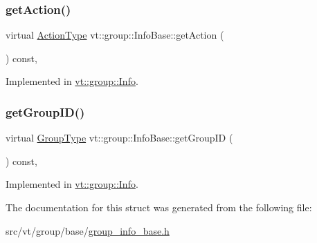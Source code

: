 \subsubsection{\texorpdfstring{get\+Action()}{getAction()}}
{\footnotesize\ttfamily virtual \hyperlink{namespacevt_ae0a5a7b18cc99d7b732cb4d44f46b0f3}{Action\+Type} vt\+::group\+::\+Info\+Base\+::get\+Action (\begin{DoxyParamCaption}{ }\end{DoxyParamCaption}) const\hspace{0.3cm}{\ttfamily [protected]}, {}}



Implemented in \hyperlink{structvt_1_1group_1_1_info_a399b8266c01f53484469b3b14cdc8640}{vt\+::group\+::\+Info}.

\mbox{\label{structvt_1_1group_1_1_info_base_afbb8a9919c924c50be2b99e2dc7cbca2}} 
\subsubsection{\texorpdfstring{get\+Group\+I\+D()}{getGroupID()}}
{\footnotesize\ttfamily virtual \hyperlink{namespacevt_a27b5e4411c9b6140c49100e050e2f743}{Group\+Type} vt\+::group\+::\+Info\+Base\+::get\+Group\+ID (\begin{DoxyParamCaption}{ }\end{DoxyParamCaption}) const\hspace{0.3cm}{\ttfamily [protected]}, {}}



Implemented in \hyperlink{structvt_1_1group_1_1_info_a09fcb16e74a5ae3043859ae70b5b57a9}{vt\+::group\+::\+Info}.



The documentation for this struct was generated from the following file\+:\begin{DoxyCompactItemize}
\item 
src/vt/group/base/\hyperlink{group__info__base_8h}{group\+\_\+info\+\_\+base.\+h}\end{DoxyCompactItemize}

